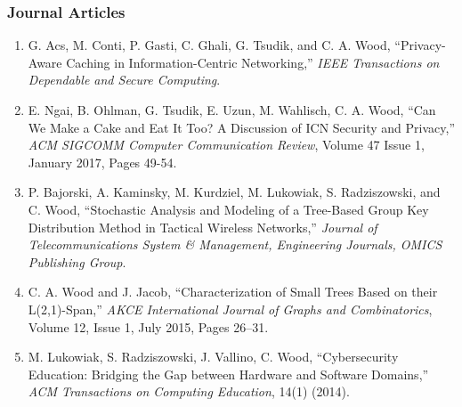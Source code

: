 \documentclass[10pt]{res}
\begin{document}
\begin{resume}
\vspace{-15pt}
\subsubsection*{Journal Articles}

\begin{enumerate}[J-1.]

\item G. Acs, M. Conti, P. Gasti, C. Ghali, G. Tsudik, and C. A. Wood, ``Privacy-Aware Caching in Information-Centric Networking,'' \emph{IEEE Transactions on Dependable and Secure Computing}.

\item E. Ngai, B. Ohlman, G. Tsudik, E. Uzun, M. Wahlisch, C. A. Wood, ``Can We Make a Cake and Eat It Too? A Discussion of ICN Security and Privacy,'' \emph{ACM SIGCOMM Computer Communication Review}, Volume 47 Issue 1, January 2017, Pages 49-54.

\item P. Bajorski, A. Kaminsky, M. Kurdziel, M. Lukowiak, S. Radziszowski, and C. Wood, ``Stochastic Analysis and Modeling of a Tree-Based Group Key Distribution Method in Tactical Wireless Networks,'' \emph{Journal of Telecommunications System \& Management, Engineering Journals, OMICS Publishing Group}.

\item C. A. Wood and J. Jacob, ``Characterization of Small Trees Based on their L(2,1)-Span,'' \emph{AKCE International Journal of Graphs and Combinatorics}, Volume 12, Issue 1, July 2015, Pages 26–31.

\item M. Lukowiak, S. Radziszowski, J. Vallino, C. Wood, ``Cybersecurity Education: Bridging the Gap between Hardware and Software Domains,'' \emph{ACM Transactions on Computing Education}, 14(1) (2014).

\end{enumerate}


\vspace{-15pt}

\end{resume}
\end{document}
